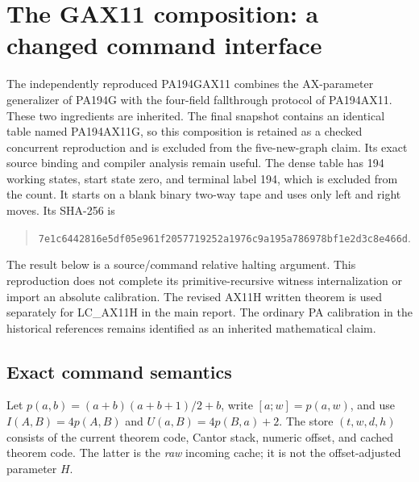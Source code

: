 \section{The GAX11 composition: a changed command interface}

The independently reproduced PA194GAX11 combines the AX-parameter generalizer
of PA194G with the four-field fallthrough protocol of PA194AX11.
These two ingredients are inherited. The final snapshot contains an
identical table named PA194AX11G, so this composition is retained as a
checked concurrent reproduction and is excluded from the five-new-graph
claim. Its exact source binding and compiler analysis remain useful.
The dense table has 194 working states, start state zero, and terminal
label 194, which is excluded from the count. It starts on a blank binary
two-way tape and uses only left and right moves. Its SHA-256 is
\begin{quote}\small\texttt{7e1c6442816e5df05e961f2057719252a1976c9a195a786978bf1e2d3c8e466d}.\end{quote}

The result below is a source/command relative halting argument. This
reproduction does not complete its primitive-recursive witness
internalization or import an absolute calibration. The revised AX11H
written theorem is used separately for LC\_AX11H in the main report.
The ordinary PA calibration in the historical references remains
identified as an inherited mathematical claim.

\subsection{Exact command semantics}

Let $p(a,b)=(a+b)(a+b+1)/2+b$, write $[a;w]=p(a,w)$, and use
$I(A,B)=4p(A,B)$ and $U(a,B)=4p(B,a)+2$.
The store $(t,w,d,h)$ consists of the current theorem code, Cantor stack,
numeric offset, and cached theorem code. The latter is the \emph{raw}
incoming cache; it is not the offset-adjusted parameter $H$.

